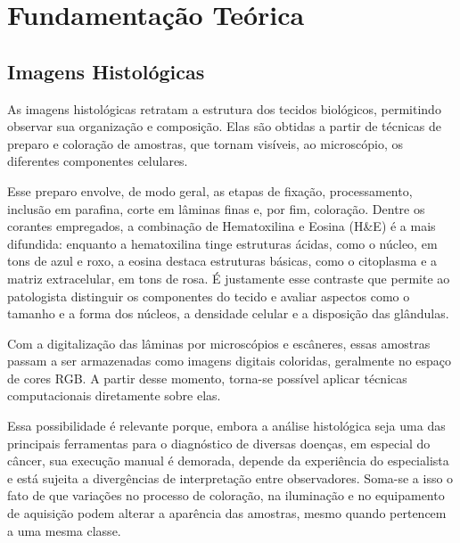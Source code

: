 
\section{Fundamentação Teórica}

\subsection{Imagens Histológicas}
\hspace{+15pt}


As imagens histológicas retratam a estrutura dos tecidos biológicos, permitindo observar sua organização e composição. Elas são obtidas a partir de técnicas de preparo e coloração de amostras, que tornam visíveis, ao microscópio, os diferentes componentes celulares.

Esse preparo envolve, de modo geral, as etapas de fixação, processamento, inclusão em parafina, corte em lâminas finas e, por fim, coloração. Dentre os corantes empregados, a combinação de Hematoxilina e Eosina (H\&E) é a mais difundida: enquanto a hematoxilina tinge estruturas ácidas, como o núcleo, em tons de azul e roxo, a eosina destaca estruturas básicas, como o citoplasma e a matriz extracelular, em tons de rosa. %
É justamente esse contraste que permite ao patologista distinguir os componentes do tecido e avaliar aspectos como o tamanho e a forma dos núcleos, a densidade celular e a disposição das glândulas.

Com a digitalização das lâminas por microscópios e escâneres, essas amostras passam a ser armazenadas como imagens digitais coloridas, geralmente no espaço de cores RGB. A partir desse momento, torna-se possível aplicar técnicas computacionais diretamente sobre elas. %

Essa possibilidade é relevante porque, embora a análise histológica seja uma das principais ferramentas para o diagnóstico de diversas doenças, em especial do câncer, sua execução manual é demorada, depende da experiência do especialista e está sujeita a divergências de interpretação entre observadores. Soma-se a isso o fato de que variações no processo de coloração, na iluminação e no equipamento de aquisição podem alterar a aparência das amostras, mesmo quando pertencem a uma mesma classe. %

